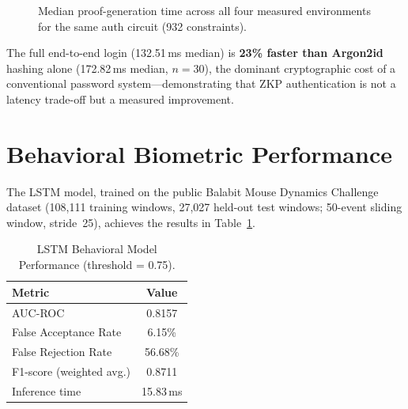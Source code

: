 \documentclass[12pt,a4paper,oneside]{report}
\begin{document}
\begin{figure}[H]
\centering
{}
\caption{Median proof-generation time across all four measured
environments for the same auth circuit (932 constraints).}
\label{fig:env_comparison}
\end{figure}

The full end-to-end login (132.51\,ms median) is \textbf{23\% faster than
Argon2id} hashing alone (172.82\,ms median, $n=30$), the dominant
cryptographic cost of a conventional password system---demonstrating that
ZKP authentication is not a latency trade-off but a measured improvement.

\section{Behavioral Biometric Performance}

The LSTM model, trained on the public Balabit Mouse Dynamics Challenge
dataset (108{,}111 training windows, 27{,}027 held-out test windows; 50-event
sliding window, stride~25), achieves the results in
Table~\ref{tab:lstm_results}.

\begin{table}[H]
\renewcommand{\arraystretch}{1.2}
\caption{LSTM Behavioral Model Performance (threshold = 0.75).}
\label{tab:lstm_results}
\centering
\begin{tabular}{lc}
\toprule
\textbf{Metric} & \textbf{Value} \\
\midrule
AUC-ROC                  & 0.8157 \\
False Acceptance Rate    & 6.15\% \\
False Rejection Rate     & 56.68\% \\
F1-score (weighted avg.) & 0.8711 \\
Inference time           & 15.83\,ms \\
\bottomrule
\end{tabular}
\end{table}
\end{document}
